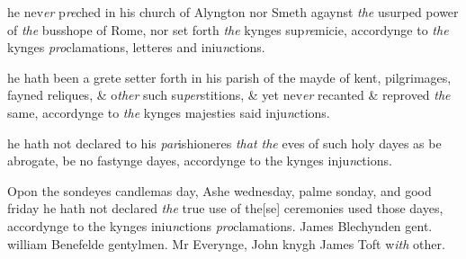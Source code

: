 \documentclass[12pt, a4paper]{book}
\begin{document}
            	
				\marginpar[\vspace{0.5cm}{\textcolor{Gray}{n}}]{}
			
            	
		\ifthenelse{\isodd{\thepage}}
		{\reversemarginpar}
		{\normalmarginpar}
		he nev\textit{er} p\textit{re}ched in his church of Alyngton nor Smeth
 agaynst \textit{the} usurped power of \textit{the} busshope of Rome, nor
 set forth \textit{the} kynges sup\textit{re}micie, accordynge to \textit{the} kynges \textit{pro}clamations, letteres and iniu\textit{n}ctions.
               
            	
				\marginpar[\vspace{0.5cm}{\textcolor{Gray}{pilgrimages}}]{}
			
		\ifthenelse{\isodd{\thepage}}
		{\reversemarginpar}
		{\normalmarginpar}
		 he hath been a grete setter forth in his parish
			 of the mayde of kent,
 pilgrimages, fayned reliques, \& o\textit{ther} such su\textit{per}stitions, \& yet
 nev\textit{er} recanted \& reproved \textit{the} same, accordynge to \textit{the} kynges
            		majesties said inju\textit{n}ctions.
            	
            	
			
            		
		\ifthenelse{\isodd{\thepage}}
		{\reversemarginpar}
		{\normalmarginpar}
		he hath not declared to his \textit{par}ishioneres \textit{that the} eves of
 such holy dayes as be abrogate, be no fastynge dayes,
 accordynge to the kynges inju\textit{n}ctions.
            	
            	
				\marginpar[\vspace{0.5cm}{\textcolor{Gray}{ceremonies}}]{}
			
            		
		\ifthenelse{\isodd{\thepage}}
		{\reversemarginpar}
		{\normalmarginpar}
		Opon the sondeyes
			 candlemas day, Ashe wednesday, palme sonday,
            			and good friday he hath not declared \textit{the} true use of the[se]
 ceremonies used those dayes, accordynge to the kynges
 iniu\textit{n}ctions \textit{pro}clamations. James Blechynden gent.
            			william Benefelde gentylmen. Mr Everynge, John knygh
            			James Toft w\textit{ith} other.
            	
\end{document}
